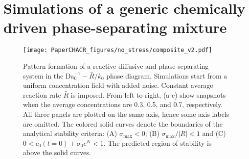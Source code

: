 \documentclass[reprint,aps,pre,superscriptaddress]{revtex4-2}
\let\originalleft\left
\let\originalright\right
\renewcommand{\left}{\mathopen{}\mathclose\bgroup\originalleft}
\renewcommand{\right}{\aftergroup\egroup\originalright}
\begin{document}
%
%

\section{Simulations of a generic chemically driven phase-separating mixture} \label{sec::simulation}

\begin{figure*}[htb]
  \texttt{[image: PaperCHACR\_figures/no\_stress/composite\_v2.pdf]}
  \caption{Pattern formation of a reactive-diffusive and phase-separating system in the $\text{Da}_0^{-1}-\bar{R}/k_0$ phase diagram. Simulations start from a uniform concentration field with added noise. Constant average reaction rate $\bar{R}$ is imposed. From left to right, (a-c) show snapshots when the average concentrations are 0.3, 0.5, and 0.7, respectively. All three panels are plotted on the same axis, hence some axis labels are omitted. The colored solid curves denote the boundaries of the analytical stability criteria: (A) $\sigma_\text{max}<0$; (B) $\sigma_\text{max}/|R|<1$ and (C) $0 < c_0(t=0) \pm \sigma_0 e^K < 1$. The predicted region of stability is above the solid curves.}
  \label{fig::no_stress}
\end{figure*}
\end{document}
